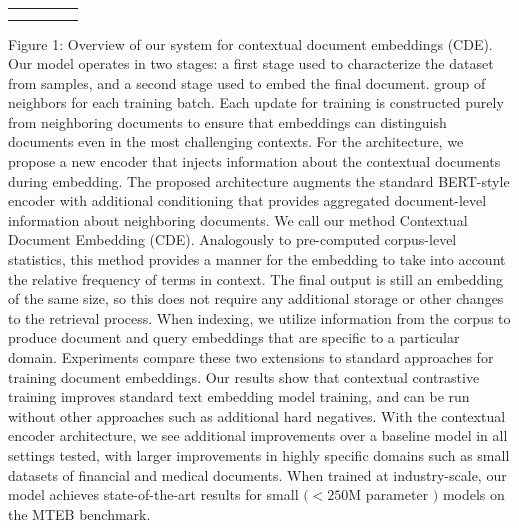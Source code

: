 \begin{tabular}{|c|c|c|c|c|}
\hline & & & & \\
\hline & & & & \\
\hline & & & & \\
\hline
\end{tabular}
Figure 1: Overview of our system for contextual document embeddings (CDE). Our model operates in two stages: a first stage used to characterize the dataset from samples, and a second stage used to embed the final document.
group of neighbors for each training batch. Each update for training is constructed purely from neighboring documents to ensure that embeddings can distinguish documents even in the most challenging contexts.
For the architecture, we propose a new encoder that injects information about the contextual documents during embedding. The proposed architecture augments the standard BERT-style encoder with additional conditioning that provides aggregated document-level information about neighboring documents. We call our method Contextual Document Embedding (CDE). Analogously to pre-computed corpus-level statistics, this method provides a manner for the embedding to take into account the relative frequency of terms in context. The final output is still an embedding of the same size, so this does not require any additional storage or other changes to the retrieval process. When indexing, we utilize information from the corpus to produce document and query embeddings that are specific to a particular domain.
Experiments compare these two extensions to standard approaches for training document embeddings. Our results show that contextual contrastive training improves standard text embedding model training, and can be run without other approaches such as additional hard negatives. With the contextual encoder architecture, we see additional improvements over a baseline model in all settings tested, with larger improvements in highly specific domains such as small datasets of financial and medical documents. When trained at industry-scale, our model achieves state-of-the-art results for small \((<250 \mathrm{M}\) parameter \()\) models on the MTEB benchmark.
